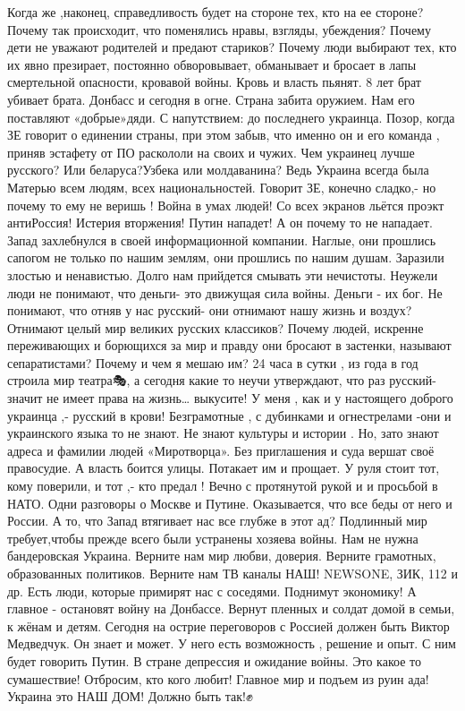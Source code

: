Когда же ,наконец,
справедливость 
будет  на стороне тех,
кто на ее стороне?
Почему так происходит, что поменялись нравы, взгляды, убеждения?
Почему дети не уважают родителей и предают стариков?
Почему люди выбирают тех, кто их явно презирает,
постоянно обворовывает, обманывает и бросает в лапы смертельной опасности, кровавой войны. 
Кровь и власть пьянят. 
8 лет брат убивает брата. Донбасс и сегодня в огне.  Страна забита оружием. 
Нам его поставляют «добрые»дяди. 
С напутствием: 
до последнего украинца.  
Позор, когда ЗЕ говорит о единении страны, при этом забыв, что именно он и его команда , приняв эстафету от ПО раскололи на своих и чужих. 
Чем украинец  лучше русского? Или  беларуса?Узбека или  молдаванина? Ведь Украина всегда была Матерью всем  людям, всех  национальностей.
Говорит ЗЕ, конечно сладко,- но почему то ему не веришь !
Война в умах людей!
 Со всех экранов льётся проэкт антиРоссия! 
Истерия вторжения! 
Путин нападет!
А  он почему то не нападает. 
 Запад захлебнулся в своей информационной компании.
 Наглые, они прошлись сапогом не только по нашим землям, они прошлись по нашим душам. Заразили злостью и ненавистью.  
Долго нам прийдется смывать эти нечистоты.
Неужели люди не понимают, что  деньги- это движущая сила войны.  Деньги - их бог.
Не понимают, что отняв у нас русский- они отнимают нашу жизнь и воздух?  
Отнимают целый мир великих русских классиков? 
Почему людей, искренне переживающих и борющихся за мир и правду они бросают в застенки, называют сепаратистами? 
Почему  и чем я мешаю им? 
 24 часа в сутки , из года в год строила мир театра🎭, а сегодня какие то неучи утверждают, что раз русский- значит не имеет права на жизнь… выкусите! 
У меня , как и у настоящего доброго украинца ,- русский 
в крови!
Безграмотные , с дубинками и  огнестрелами  -они и украинского языка  то 
не знают. 
Не знают культуры и истории . 
Но, зато знают 
адреса и фамилии людей «Миротворца». 
Без приглашения и суда вершат своё правосудие.
 А власть боится улицы.
Потакает им и прощает.
У руля стоит тот, кому поверили, и тот ,- кто предал !
  Вечно с протянутой рукой и  и просьбой в НАТО.  
Одни разговоры о Москве и Путине. Оказывается, что все беды от него и России. 
А то, что Запад  втягивает нас все глубже в этот ад? 
Подлинный мир требует,чтобы прежде всего были устранены хозяева войны. 
Нам не нужна бандеровская Украина. Верните нам мир любви, доверия. 
Верните грамотных, образованных политиков. 
Верните нам ТВ каналы 
НАШ!
NEWSONE, ЗИК, 112 и др.
Есть люди, которые примирят нас с соседями. 
Поднимут экономику! 
А главное - остановят войну 
на Донбассе.
Вернут пленных  и солдат домой в семьи, к жёнам и детям. 
 Сегодня на острие переговоров с Россией должен  быть 
Виктор Медведчук.  
Он знает и может. 
У него есть возможность , решение и опыт.  
С ним будет говорить Путин. 
В стране депрессия и ожидание войны. 
Это какое то сумашествие!
Отбросим, кто кого любит!
 Главное мир и 
подъем из руин ада! 
Украина это НАШ ДОМ!
Должно быть так!✊
